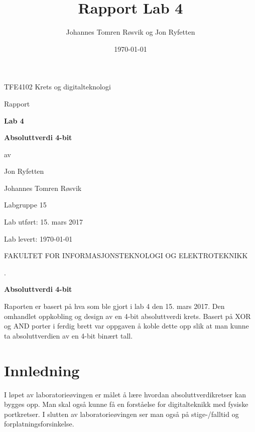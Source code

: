 \documentclass{article}
\title{Rapport Lab 4}
\author{Johannes Tomren Røsvik og Jon Ryfetten}
\date{\today}
\begin{document}

\begin{titlepage}
	\centering
	{\Large TFE4102 Krets og digitalteknologi \par}
	\vfill
	{\Large Rapport\par}
	\vspace{0.5cm}
	{\huge\bfseries Lab 4\par}
	{\huge\bfseries Absoluttverdi 4-bit\par}
	\vfill
	{av\par}
	{\Large Jon Ryfetten\par}
	{\Large Johannes Tomren Røsvik\par}
	\vspace{1cm}
	{\large Labgruppe 15 \par}
	\vfill
	{\large Lab utført: 15. mars 2017 \par}
	{\large Lab levert: \today \par}
	\vfill
	{FAKULTET FOR INFORMASJONSTEKNOLOGI OG ELEKTROTEKNIKK \par}
\end{titlepage}

\begin{titlepage}
	\centering
	{.\par}
	\vspace{7cm}
	{\huge\bfseries Absoluttverdi 4-bit \par}
	\vfill
\end{titlepage}

\newpage
Raporten er basert på hva som ble gjort i lab 4 den 15. mars 2017. Den omhandlet oppkobling og design av en 4-bit absoluttverdi krets. Basert på XOR og AND porter i ferdig brett var oppgaven å koble dette opp slik at man kunne ta absoluttverdien av en 4-bit binært tall.



\newpage

\tableofcontents{}

\newpage
{}

\section{Innledning}
I løpet av laboratorieøvingen er målet å lære hvordan absoluttverdikretser kan bygges opp. Man skal også kunne få en forståelse for digitalteknikk med fysiske portkretser. I slutten av laboratorieøvingen ser man også på stige-/falltid og forplatningsforsinkelse.
\end{document}
